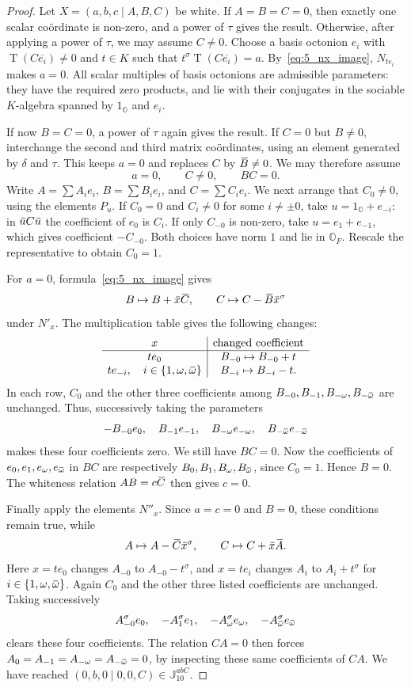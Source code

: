 \documentclass{amsart}
\def\ovA{\mathord{\mbox{\hspace*{0pt}}\,\overline{\!A\!\!\;}\!\:}\mbox{\hspace*{0pt}}}
\def\ovB{\mathord{\mbox{\hspace*{0pt}}\,\overline{\!B\!\!\;}\!\:}\mbox{\hspace*{0pt}}}
\def\ovC{\mathord{\mbox{\hspace*{0pt}}\,\overline{\!C\!\!\;}\!\:}\mbox{\hspace*{0pt}}}
\def\ovu{\mathord{\mbox{\hspace*{0pt}}\,\overline{\!u\!\!\;}\!\:}\mbox{\hspace*{0pt}}}
\def\ovx{\mathord{\mbox{\hspace*{0pt}}\,\overline{\!x\!\!\;}\!\:}\mbox{\hspace*{0pt}}}
\def\ombb{\mathord{\mbox{\hspace*{0pt}}\;\!\overline{\!\!\:\omega\!\!\:}\;\!}\mbox{\hspace*{0pt}}}
\def\OO{\mathord{\mathbb{O}}}
\newcommand{\Tr}{\operatorname{T}}
\newcommand{\J}{\mathbb{J}}
\newcommand{\s}{\sigma}
\theoremstyle{plain}
\numberwithin{theorem}{section}
\theoremstyle{definition}
\begin{document}
\begin{proof}
	Let $X=(a,b,c\mid A,B,C)$ be white. If $A=B=C=0$, then exactly one
	scalar co\"ordinate is non-zero, and a power of $\tau$ gives the result.
	Otherwise, after applying a power of $\tau$, we may assume $C\neq0$.
	Choose a basis octonion $e_i$ with $\Tr(C\overline{e_i})\neq0$ and
	$t\in K$ such that $t^{\s}\Tr(C\overline{e_i})=a$.
	By~\eqref{eq:5_nx_image}, $N_{t e_i}$ makes $a=0$.
	All scalar multiples of basis octonions are admissible parameters:
	they have the required zero products, and lie with their conjugates
	in the sociable $K$-algebra spanned by $1_{\OO}$ and $e_i$.

	If now $B=C=0$, a power of $\tau$ again gives the result. If $C=0$
	but $B\neq0$, interchange the second and third matrix co\"ordinates,
	using an element generated by $\delta$ and $\tau$. This keeps $a=0$
	and replaces $C$ by $\ovB\neq0$. We may therefore assume
	\[
		a=0,\qquad C\neq0,\qquad BC=0.
	\]
	Write $A=\sum A_i e_i$, $B=\sum B_i e_i$, and $C=\sum C_i e_i$.
	We next arrange that $C_0\neq0$, using the elements $P_u$.
	If $C_0=0$ and $C_i\neq0$ for some $i\neq\pm0$, take
	$u=1_{\OO}+e_{-i}$: in $\ovu C\ovu$ the coefficient of $e_0$ is $C_i$.
	If only $C_{-0}$ is non-zero, take $u=e_1+e_{-1}$, which gives
	coefficient $-C_{-0}$. Both choices have norm $1$ and lie in $\OO_F$.
	Rescale the representative to obtain $C_0=1$.

	For $a=0$, formula~\eqref{eq:5_nx_image} gives
	\[
		B\mapsto B+\ovx\ovC,\qquad C\mapsto C-\ovB\ovx^{\s}
	\]
	under $N'_x$. The multiplication table gives the following changes:
	\[
	\begin{array}{c|c}
		x&\text{changed coefficient}\\ \hline
		t e_0&B_{-0}\mapsto B_{-0}+t\\
		t e_{-i},\quad i\in\{1,\omega,\ombb\}
			&B_{-i}\mapsto B_{-i}-t .
	\end{array}
	\]
	In each row, $C_0$ and the other three coefficients among
	$B_{-0},B_{-1},B_{-\omega},B_{-\ombb}$ are unchanged.
	Thus, successively taking the parameters
	\[
		-B_{-0}e_0,\quad B_{-1}e_{-1},\quad
		B_{-\omega}e_{-\omega},\quad B_{-\ombb}e_{-\ombb}
	\]
	makes these four coefficients zero. We still have $BC=0$.
	Now the coefficients of $e_0,e_1,e_{\omega},e_{\ombb}$ in $BC$ are
	respectively $B_0,B_1,B_{\omega},B_{\ombb}$, since $C_0=1$.
	Hence $B=0$. The whiteness relation $AB=c\ovC$ then gives $c=0$.

	Finally apply the elements $N''_x$. Since $a=c=0$ and $B=0$, these
	conditions remain true, while
	\[
		A\mapsto A-\ovC\ovx^{\s},\qquad C\mapsto C+\ovx\ovA.
	\]
	Here $x=t e_0$ changes $A_{-0}$ to $A_{-0}-t^{\s}$, and
	$x=t e_i$ changes $A_i$ to $A_i+t^{\s}$ for
	$i\in\{1,\omega,\ombb\}$. Again $C_0$ and the other three listed
	coefficients are unchanged. Taking successively
	\[
		A_{-0}^{\s}e_0,\quad -A_1^{\s}e_1,\quad
		-A_{\omega}^{\s}e_{\omega},\quad -A_{\ombb}^{\s}e_{\ombb}
	\]
	clears these four coefficients. The relation $CA=0$ then forces
	$A_0=A_{-1}=A_{-\omega}=A_{-\ombb}=0$, by inspecting these same
	coefficients of $CA$. We have reached
	$(0,b,0\mid0,0,C)\in\J_{10}^{abC}$.
\end{proof}
\end{document}
